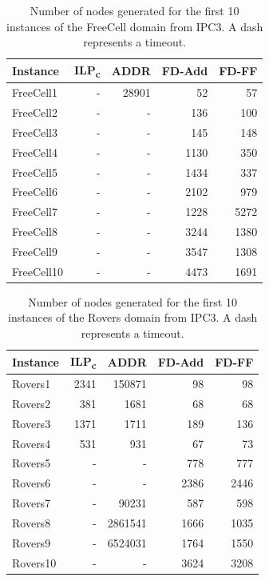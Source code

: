 \begin{table}[p]
    \centering
    \begin{tabular}{lrrrr}
        \hline
        \textbf{Instance} & \textbf{ILP\textsubscript{c}} & \textbf{ADDR} & \textbf{FD-Add} & \textbf{FD-FF} \\ 
        \hline
        FreeCell1 & - & 28901 & 52 & 57 \\
        FreeCell2 & - & - & 136 & 100 \\ 
        FreeCell3 & - & - & 145 & 148 \\
        FreeCell4 & - & - & 1130 & 350 \\
        FreeCell5 & - & - & 1434 & 337 \\ 
        FreeCell6 & - & - & 2102 & 979 \\ 
        FreeCell7 & - & - & 1228 & 5272 \\
        FreeCell8 & - & - & 3244 & 1380 \\ 
        FreeCell9 & - & - & 3547 & 1308 \\ 
        FreeCell10 & - & - & 4473 & 1691 \\ 
        \hline
    \end{tabular}
    \caption{Number of nodes generated for the first 10 instances of the FreeCell domain from IPC3. A dash represents a timeout.}
    \label{fig:freeCellNodes}
\end{table}


\begin{table}[p]
    \centering
    \begin{tabular}{lrrrr}
        \hline
        \textbf{Instance} & \textbf{ILP\textsubscript{c}} & \textbf{ADDR} & \textbf{FD-Add} & \textbf{FD-FF} \\ 
        \hline
        Rovers1 & 2341 & 150871 & 98 & 98 \\
        Rovers2 & 381 & 1681 & 68 & 68 \\ 
        Rovers3 & 1371 & 1711 & 189 & 136 \\ 
        Rovers4 & 531 & 931 & 67 & 73 \\
        Rovers5 & - & - & 778 & 777 \\ 
        Rovers6 & - & - & 2386 & 2446 \\ 
        Rovers7 & - & 90231 & 587 & 598 \\ 
        Rovers8 & - & 2861541 & 1666 & 1035 \\ 
        Rovers9 & - & 6524031 & 1764 & 1550 \\ 
        Rovers10 & - & - & 3624 & 3208 \\
        \hline
    \end{tabular}
    \caption{Number of nodes generated for the first 10 instances of the Rovers domain from IPC3. A dash represents a timeout.}
    \label{fig:roversNodes}
\end{table}


